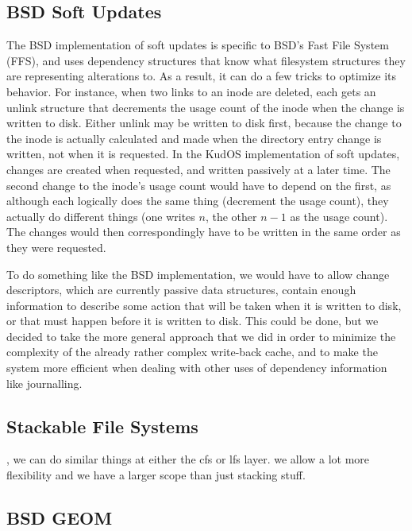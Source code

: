 \subsection{BSD Soft Updates}

The BSD implementation of soft updates \cite{ganger00soft} is specific to BSD's
Fast File System (FFS), and uses dependency structures that know what filesystem
structures they are representing alterations to. As a result, it can do a few
tricks to optimize its behavior. For instance, when two links to an inode are
deleted, each gets an unlink structure that decrements the usage count of the
inode when the change is written to disk. Either unlink may be written to disk
first, because the change to the inode is actually calculated and made when the
directory entry change is written, not when it is requested. In the KudOS
implementation of soft updates, changes are created when requested, and written
passively at a later time. The second change to the inode's usage count would
have to depend on the first, as although each logically does the same thing
(decrement the usage count), they actually do different things (one writes $n$,
the other $n - 1$ as the usage count). The changes would then correspondingly
have to be written in the same order as they were requested.

To do something like the BSD implementation, we would have to allow change
descriptors, which are currently passive data structures, contain enough
information to describe some action that will be taken when it is written to
disk, or that must happen before it is written to disk. This could be done, but
we decided to take the more general approach that we did in order to minimize
the complexity of the already rather complex write-back cache, and to make the
system more efficient when dealing with other uses of dependency information
like journalling.

\subsection{Stackable File Systems}

\cite{zadok00fist}, \cite{heidemann93stack}
we can do similar things at either the cfs or lfs layer. we allow a
lot more flexibility and we have a larger scope than just stacking
stuff.

\subsection{BSD GEOM}

